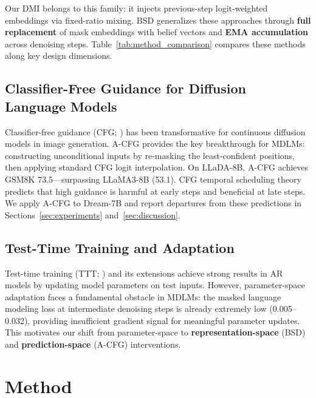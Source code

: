\documentclass{article}
\begin{document}
Our DMI belongs to this family: it injects previous-step logit-weighted embeddings via fixed-ratio mixing. BSD generalizes these approaches through \textbf{full replacement} of mask embeddings with belief vectors and \textbf{EMA accumulation} across denoising steps. Table~\ref{tab:method_comparison} compares these methods along key design dimensions.

\subsection{Classifier-Free Guidance for Diffusion Language Models}

Classifier-free guidance (CFG; \citealp{ho2022cfg}) has been transformative for continuous diffusion models in image generation. A-CFG \citep{arriola2025acfg} provides the key breakthrough for MDLMs: constructing unconditional inputs by re-masking the least-confident positions, then applying standard CFG logit interpolation. On LLaDA-8B, A-CFG achieves GSM8K 73.5---surpassing LLaMA3-8B (53.1). CFG temporal scheduling theory \citep{rojas2025cfgschedule} predicts that high guidance is harmful at early steps and beneficial at late steps. We apply A-CFG to Dream-7B and report departures from these predictions in Sections~\ref{sec:experiments} and~\ref{sec:discussion}.

\subsection{Test-Time Training and Adaptation}

Test-time training (TTT; \citealp{sun2024ttt}) and its extensions achieve strong results in AR models by updating model parameters on test inputs. However, parameter-space adaptation faces a fundamental obstacle in MDLMs: the masked language modeling loss at intermediate denoising steps is already extremely low (0.005--0.032), providing insufficient gradient signal for meaningful parameter updates. This motivates our shift from parameter-space to \textbf{representation-space} (BSD) and \textbf{prediction-space} (A-CFG) interventions.


\section{Method}
\label{sec:method}
\end{document}
